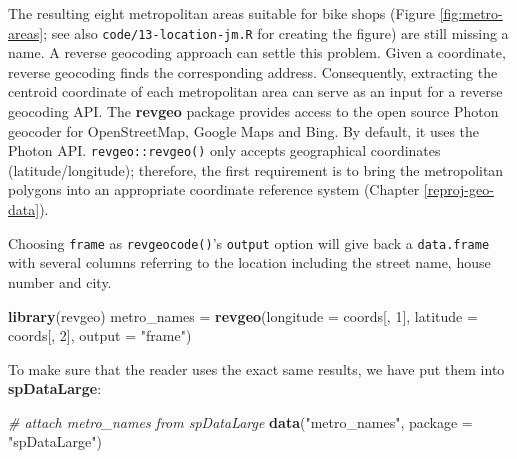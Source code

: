 \documentclass[]{krantz}
\newenvironment{Shaded}{\begin{snugshade}}{\end{snugshade}}
\newcommand{\CommentTok}[1]{\textcolor[rgb]{0.37,0.37,0.37}{\textit{#1}}}
\newcommand{\DataTypeTok}[1]{\textcolor[rgb]{0.27,0.27,0.27}{#1}}
\newcommand{\DecValTok}[1]{\textcolor[rgb]{0.06,0.06,0.06}{#1}}
\newcommand{\KeywordTok}[1]{\textcolor[rgb]{0.27,0.27,0.27}{\textbf{#1}}}
\newcommand{\NormalTok}[1]{#1}
\newcommand{\OperatorTok}[1]{\textcolor[rgb]{0.43,0.43,0.43}{\textbf{#1}}}
\newcommand{\StringTok}[1]{\textcolor[rgb]{0.5,0.5,0.5}{#1}}
\begin{document}
The resulting eight metropolitan areas suitable for bike shops (Figure \ref{fig:metro-areas}; see also \texttt{code/13-location-jm.R} for creating the figure) are still missing a name.
A reverse geocoding approach can settle this problem.
Given a coordinate, reverse geocoding finds the corresponding address.
Consequently, extracting the centroid coordinate of each metropolitan area can serve as an input for a reverse geocoding API.
The \textbf{revgeo} package provides access to the open source Photon geocoder for OpenStreetMap, Google Maps and Bing.
By default, it uses the Photon API.
\texttt{revgeo::revgeo()} only accepts geographical coordinates (latitude/longitude); therefore, the first requirement is to bring the metropolitan polygons into an appropriate coordinate reference system (Chapter \ref{reproj-geo-data}).

\begin{Shaded}
\end{Shaded}

Choosing \texttt{frame} as \texttt{revgeocode()}'s \texttt{output} option will give back a \texttt{data.frame} with several columns referring to the location including the street name, house number and city.

\begin{Shaded}
\begin{Highlighting}[]
\KeywordTok{library}\NormalTok{(revgeo)}
\NormalTok{metro_names =}\StringTok{ }\KeywordTok{revgeo}\NormalTok{(}\DataTypeTok{longitude =}\NormalTok{ coords[, }\DecValTok{1}\NormalTok{], }\DataTypeTok{latitude =}\NormalTok{ coords[, }\DecValTok{2}\NormalTok{], }
                     \DataTypeTok{output =} \StringTok{"frame"}\NormalTok{)}
\end{Highlighting}
\end{Shaded}

To make sure that the reader uses the exact same results, we have put them into \textbf{spDataLarge}:

\begin{Shaded}
\begin{Highlighting}[]
\CommentTok{# attach metro_names from spDataLarge}
\KeywordTok{data}\NormalTok{(}\StringTok{"metro_names"}\NormalTok{, }\DataTypeTok{package =} \StringTok{"spDataLarge"}\NormalTok{)}
\end{Highlighting}
\end{Shaded}
\end{document}
